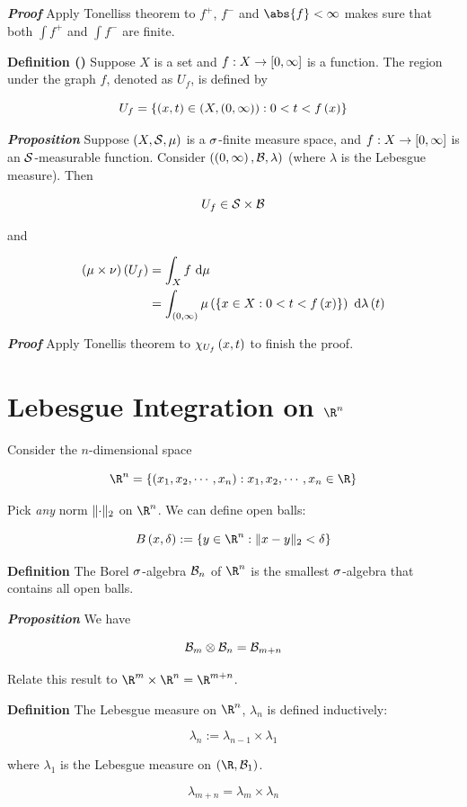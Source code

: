 \documentclass[
]{article}
\begin{document}
\emph{\textbf{Proof}} Apply Tonellis\textquotesingle s theorem to
\(f^+\), \(f^-\) and \(\abs{f}<\infty\) makes sure that both
\(\int f^+\) and \(\int f^-\) are finite.

\textbf{Definition ()} Suppose \(X\) is a set and
\(f:X\to\br{0,\infty}\) is a function. The region under the graph \(f\),
denoted as \(U_f\), is defined by

\[U_f = \brace{\pr{x,t}\in \pr{X,\pr{0,\infty}}:0<t<f\pr{x}}\]

\emph{\textbf{Proposition}} Suppose \(\pr{X,\S,\mu}\) is a \(\s\)-finite
measure space, and \(f:X\to\br{0,\infty}\) is an \(\S\)-measurable
function. Consider \(\pr{\pr{0,\infty},\B,\lambda}\) (where \(\lambda\)
is the Lebesgue measure). Then

\[U_f\in \S\times \B\]

and

\[\ba
\mn\pr{U_f} & = \int_X f\dm\\
& = \int_{\pr{0,\infty}} \lm{\brace{x\in X:0<t<f\pr{x}}}\dl\pr{t}
\ea\]

\emph{\textbf{Proof}} Apply Tonellis\textquotesingle{} theorem to
\(\chi_{U_f}\pr{x,t}\) to finish the proof.

\hypertarget{lebesgue-integration-on--r-n}{%
\section{\texorpdfstring{Lebesgue Integration on
\(\R^n\)}{Lebesgue Integration on \textbackslash R\^{}n}}\label{lebesgue-integration-on--r-n}}

Consider the \(n\)-dimensional space

\[\R^n = \brace{\pr{x_1,x_2,\cdots,x_n}:x_1,x_2,\cdots,x_n\in \R}\]

Pick \emph{any} norm \(\norm[2]{\cdot}\) on \(\R^n\). We can define open
balls:

\[B\pr{x,\delta}:=\brace{y\in \R^n:\norm[2]{x-y}<\delta}\]

\textbf{Definition} The Borel \(\s\)-algebra \(\B_n\) of \(\R^n\) is the
smallest \(\s\)-algebra that contains all open balls.

\emph{\textbf{Proposition}} We have

\[\B_m\otimes \B_n = \B_{m+n}\]

Relate this result to \(\R^m\times \R^n =\R^{m+n}\).

\textbf{Definition} The Lebesgue measure on \(\R^n\), \(\lambda_n\) is
defined inductively:

\[\lambda_n:=\lambda_{n-1}\times \lambda_1\]

where \(\lambda_1\) is the Lebesgue measure on \(\pr{\R,\B_1}\).

\[\lambda_{m+n} = \lambda_m\times \lambda_n\]
\end{document}
